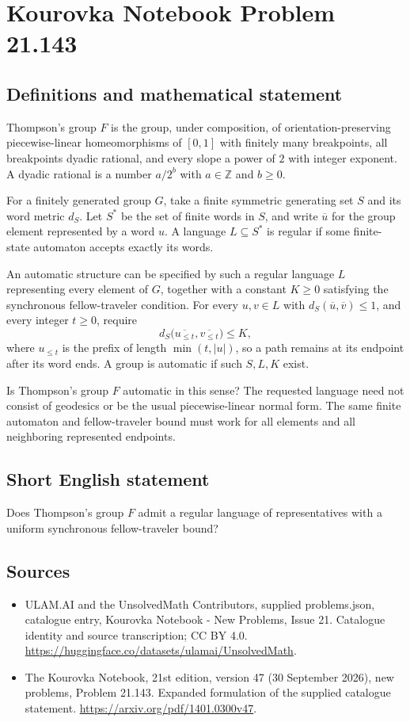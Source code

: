 \documentclass[11pt,a4paper]{article}
\begin{document}
\section*{Kourovka Notebook Problem 21.143}\label{statement}

\subsection{Definitions and mathematical statement}
Thompson's group $F$ is the group, under composition, of orientation-preserving piecewise-linear homeomorphisms of $[0,1]$ with finitely many breakpoints, all breakpoints dyadic rational, and every slope a power of $2$ with integer exponent. A dyadic rational is a number $a/2^b$ with $a\in\mathbb Z$ and $b\ge0$.

For a finitely generated group $G$, take a finite symmetric generating set $S$ and its word metric $d_S$. Let $S^*$ be the set of finite words in $S$, and write $\overline u$ for the group element represented by a word $u$. A language $L\subseteq S^*$ is regular if some finite-state automaton accepts exactly its words.

An automatic structure can be specified by such a regular language $L$ representing every element of $G$, together with a constant $K\ge0$ satisfying the synchronous fellow-traveler condition. For every $u,v\in L$ with $d_S(\overline u,\overline v)\le1$, and every integer $t\ge0$, require
\[
 d_S\bigl(\overline{u_{\le t}},\overline{v_{\le t}}\bigr)\le K,
\]
where $u_{\le t}$ is the prefix of length $\min(t,|u|)$, so a path remains at its endpoint after its word ends. A group is automatic if such $S,L,K$ exist.

Is Thompson's group $F$ automatic in this sense? The requested language need not consist of geodesics or be the usual piecewise-linear normal form. The same finite automaton and fellow-traveler bound must work for all elements and all neighboring represented endpoints.
\subsection{Short English statement}
Does Thompson’s group $F$ admit a regular language of representatives with a uniform synchronous fellow-traveler bound?
\subsection{Sources}
\begin{itemize}
\item[S1] ULAM.AI and the UnsolvedMath Contributors, supplied problems.json, catalogue entry, Kourovka Notebook - New Problems, Issue 21. Catalogue identity and source transcription; CC BY 4.0.
\url{https://huggingface.co/datasets/ulamai/UnsolvedMath}.
\item[S2] The Kourovka Notebook, 21st edition, version 47 (30 September 2026), new problems, Problem 21.143. Expanded formulation of the supplied catalogue statement.
\url{https://arxiv.org/pdf/1401.0300v47}.
\end{itemize}
\end{document}
